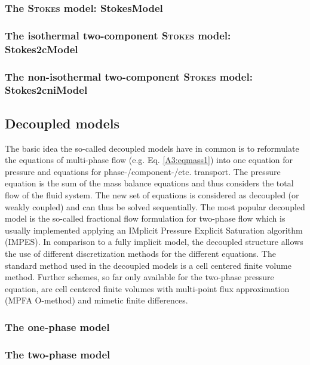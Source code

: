 \subsubsection{The \textsc{Stokes} model: StokesModel} 


\subsubsection{The isothermal two-component \textsc{Stokes} model: Stokes2cModel} 


\subsubsection{The non-isothermal two-component \textsc{Stokes} model: Stokes2cniModel} 


\subsection{Decoupled models}
%
The basic idea the so-called decoupled models have in common is to reformulate the equations of multi-phase flow (e.g. Eq. \ref{A3:eqmass1}) into one equation for pressure and equations for phase-/component-/etc. transport. The pressure equation is the sum of the mass balance equations and thus considers the total flow of the fluid system. The new set of equations is considered as decoupled (or weakly coupled) and can thus be solved sequentially. The most popular decoupled model is the so-called fractional flow formulation for two-phase flow which is usually implemented applying an IMplicit Pressure Explicit Saturation algorithm (IMPES).
In comparison to a fully implicit model, the decoupled structure allows the use of different discretization methods for the different equations. The standard method used in the decoupled models is a cell centered finite volume method. Further schemes, so far only available for the two-phase pressure equation, are cell centered finite volumes with multi-point flux approximation (MPFA O-method) and mimetic finite differences.
%
\subsubsection{The one-phase model}


\subsubsection{The two-phase model}

